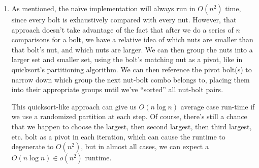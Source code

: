 \documentclass[12pt]{article}
\begin{document}
\begin{enumerate}
    \item As mentioned, the naïve implementation will always run in $O(n^2)$ time, since every bolt is exhaustively 
    compared with every nut. However, that approach doesn't take advantage of the fact that after we do a series of $n$ 
    comparisons for a bolt, we have a relative idea of which nuts are smaller than that bolt's nut, and which nuts are 
    larger. We can then group the nuts into a larger set and smaller set, using the bolt's matching nut as a pivot, like 
    in quicksort's partitioning algorithm. We can then reference the pivot bolt(s) to narrow down which group the next nut-bolt 
    combo belongs to, placing them into their appropriate groups until we've ``sorted'' all nut-bolt pairs.

    This quicksort-like approach can give us $O(n\log n)$ average case run-time if we use a randomized partition at each 
    step. Of course, there's still a chance that we happen to choose the largest, then second largest, then third largest, 
    etc. bolt as a pivot in each iteration, which can cause the runtime to degenerate to $O(n^2)$, but in almost all cases, we can expect 
    a $O(n\log n) \in o(n^2)$ runtime.
\end{enumerate}
\end{document}
